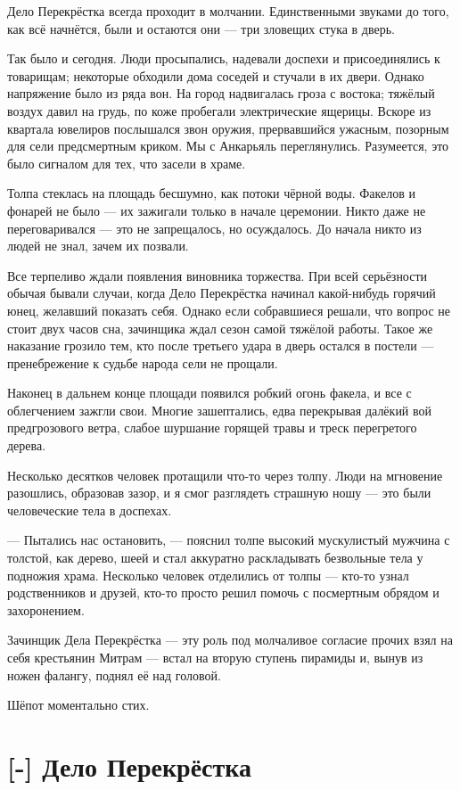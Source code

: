Дело Перекрёстка всегда проходит в молчании.
Единственными звуками до того, как всё начнётся, были и остаются они --- три зловещих стука в дверь.

Так было и сегодня.
Люди просыпались, надевали доспехи и присоединялись к товарищам;
некоторые обходили дома соседей и стучали в их двери.
Однако напряжение было из ряда вон.
На город надвигалась гроза с востока;
тяжёлый воздух давил на грудь, по коже пробегали электрические ящерицы.
Вскоре из квартала ювелиров послышался звон оружия, прервавшийся ужасным, позорным для сели предсмертным криком.
Мы с Анкарьяль переглянулись.
Разумеется, это было сигналом для тех, что засели в храме.

Толпа стеклась на площадь бесшумно, как потоки чёрной воды.
Факелов и фонарей не было --- их зажигали только в начале церемонии.
Никто даже не переговаривался --- это не запрещалось, но осуждалось.
До начала никто из людей не знал, зачем их позвали.

Все терпеливо ждали появления виновника торжества.
При всей серьёзности обычая бывали случаи, когда Дело Перекрёстка начинал какой-нибудь горячий юнец, желавший показать себя.
Однако если собравшиеся решали, что вопрос не стоит двух часов сна, зачинщика ждал сезон самой тяжёлой работы.
Такое же наказание грозило тем, кто после третьего удара в дверь остался в постели --- пренебрежение к судьбе народа сели не прощали.

Наконец в дальнем конце площади появился робкий огонь факела, и все с облегчением зажгли свои.
Многие зашептались, едва перекрывая далёкий вой предгрозового ветра, слабое шуршание горящей травы и треск перегретого дерева.

Несколько десятков человек протащили что-то через толпу.
Люди на мгновение разошлись, образовав зазор, и я смог разглядеть страшную ношу --- это были человеческие тела в доспехах.

--- Пытались нас остановить, --- пояснил толпе высокий мускулистый мужчина с толстой, как дерево, шеей и стал аккуратно раскладывать безвольные тела у подножия храма.
Несколько человек отделились от толпы --- кто-то узнал родственников и друзей, кто-то просто решил помочь с посмертным обрядом и захоронением.

Зачинщик Дела Перекрёстка --- эту роль под молчаливое согласие прочих взял на себя крестьянин Митрам --- встал на вторую ступень пирамиды и, вынув из ножен фалангу, поднял её над головой.

Шёпот моментально стих.

\section{[-] Дело Перекрёстка}

